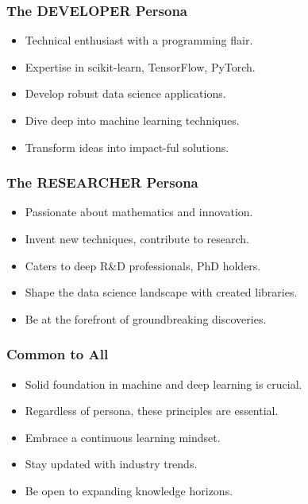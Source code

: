 \begin{frame}[fragile]\frametitle{The DEVELOPER  Persona}
        \begin{itemize}
            \item Technical enthusiast with a programming flair.
            \item Expertise in scikit-learn, TensorFlow, PyTorch.
            \item Develop robust data science applications.
            \item Dive deep into machine learning techniques.
            \item Transform ideas into impact-ful solutions.
        \end{itemize}
\end{frame}

\begin{frame}[fragile]\frametitle{The RESEARCHER   Persona}
        \begin{itemize}
            \item Passionate about mathematics and innovation.
            \item Invent new techniques, contribute to research.
            \item Caters to deep R\&D professionals, PhD holders.
            \item Shape the data science landscape with created libraries.
            \item Be at the forefront of groundbreaking discoveries.
        \end{itemize}
\end{frame}

\begin{frame}[fragile]\frametitle{Common to All}
        \begin{itemize}
            \item Solid foundation in machine and deep learning is crucial.
            \item Regardless of persona, these principles are essential.
            \item Embrace a continuous learning mindset.
            \item Stay updated with industry trends.
            \item Be open to expanding knowledge horizons.
        \end{itemize}
\end{frame}

